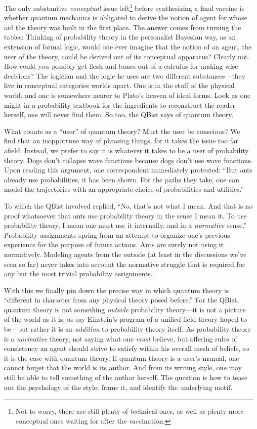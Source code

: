 \documentclass[aps,pra,superscriptaddress,12pt,tightenlines,nofootinbib]{revtex4-2}
\begin{document}
The only substantive {\it conceptual\/} issue left\footnote{Not to worry, there are still plenty of technical ones,  as well as plenty more conceptual ones waiting for after the vaccination.} before synthesizing a final vaccine is whether quantum mechanics is obligated to derive the notion of agent for whose aid the theory was built in the first place.  The answer comes from turning the tables:  Thinking of probability theory in the personalist Bayesian way, as an extension of formal logic, would one ever imagine that the notion of an agent, the user of the theory, could be derived out of its conceptual apparatus?  Clearly not.  How could you possibly get flesh and bones out of a calculus for making wise decisions?  The logician and the logic he uses are two different substances---they live in conceptual categories worlds apart.  One is in the stuff of the physical world, and one is somewhere nearer to Plato's heaven of ideal forms.  Look as one might in a probability textbook for the ingredients to reconstruct the reader herself, one will never find them.  So too, the QBist says of quantum theory.

What counts as a ``user'' of quantum theory? Must the user be
conscious? We find that an inopportune way of phrasing things, for it
takes the issue too far afield. Instead, we prefer to say it is
whatever it takes to be a user of probability theory. Dogs don't
collapse wave functions because dogs don't use wave functions. Upon
reading this argument, one correspondent immediately protested: ``But
ants already use probabilities, it has been shown. For the paths they
take, one can model the trajectories with an appropriate choice of
probabilities and utilities.''

To which the QBist involved replied, ``No, that's not what I mean. And that is
no proof whatsoever that ants use probability theory in the sense I mean
it. To use probability theory, I mean one must use it internally, and in a
{\it normative\/} sense.'' Probability assignments spring from
an attempt to organize one's previous experience for the purpose of future
actions. Ants are surely not using it normatively.  Modeling agents from the
outside (at least in the discussions we've seen so far) never takes into account
the normative struggle that is required for any but the most trivial
probability assignments.

With this we finally pin down the precise way in which quantum theory is ``different in character from any physical theory posed before.''
For the QBist, quantum theory is not something {\it outside\/} probability theory---it is not a picture of the world as it is, as say Einstein's program of a unified field theory hoped to be---but rather it is an {\it addition\/} to probability theory itself.  As probability theory is a {\it normative\/} theory, not saying what one {\it must\/} believe, but offering rules of consistency an agent should strive to satisfy within his overall mesh of beliefs, so it is the case with quantum theory.  If quantum theory is a user's manual, one cannot forget that the world is its author.  And from its writing style, one may still be able to tell something of the author herself.  The question is how to tease out the psychology of the style, frame it, and identify the underlying motif.
\end{document}
